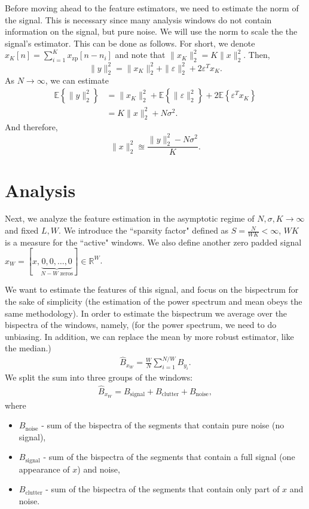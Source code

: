 \documentclass[12pt,a4paper]{article}
\numberwithin{equation}{section}
\numberwithin{figure}{section}
\theoremstyle{plain}
\theoremstyle{definition}
\theoremstyle{remark}
\theoremstyle{plain}
\theoremstyle{remark}
\theoremstyle{plain}
\theoremstyle{plain}
\newcommand{\E}[1]{\mathbb{E}\left\{{#1} \right\}}
\newcommand{\xz}{x_{\textrm{zp}}}
\begin{document}
Before moving ahead to the feature estimators, we need to estimate the norm of the signal. This is necessary since many analysis windows do not contain information on the signal, but pure noise. We will use the norm to scale the the signal's estimator.
This can be done as follows. For short, we denote $x_K[n]=\sum_{i=1}^K \xz[n-n_i]$ and note that $\|x_K\|_2^2 = K\|x\|_2^2$. 
Then,
\begin{equation}
\| y\|_2^2 =  \| x_K\|_2^2 + \|\varepsilon\|_2^2 + 2\varepsilon^Tx_K. 
\end{equation}  
As $N\to\infty$, we can estimate 
\begin{equation}
\begin{split}
\E{\| y\|_2^2} &=  \| x_K\|_2^2 + \E{\|\varepsilon\|_2^2} + 2\E{\varepsilon^Tx_K} \\ 
&= K\|x\|_2^2 + N\sigma^2. 
\end{split}	 
\end{equation}   
And therefore, 
\begin{equation}
\|x\|_2^2 \approxeq \frac{\| y\|_2^2 - N\sigma^2}{K}. 
\end{equation}


\section{Analysis} \label{sec:analysis}


Next, we analyze the feature estimation in the asymptotic regime of $N,\sigma,K\to\infty$ and fixed $L,W$. We introduce the ``sparsity factor" defined as $S = \frac{N}{WK}<\infty$, $WK$ is a measure for the ``active" windows. We also define  another zero padded signal $x_W  = [x, \underbrace{0,0,\ldots,0}_{N-W \text{ zeros}}]\in\mathbb{R}^W$.

We want to estimate the features of this signal, and focus on the bispectrum for the sake of simplicity (the estimation of the power spectrum and mean obeys the same methodology). 
In order to estimate the bispectrum we average over the bispectra of the windows, namely, (for the power spectrum, we need to do unbiasing. In addition, we can replace the mean by more robust estimator, like the median.)
\begin{eqnarray}
\hat{B}_{x_W} = \frac{W}{N}\sum_{i=1}^{N/W}B_{y_i}.
\end{eqnarray}
We split the sum into three groups of the windows:
\begin{eqnarray}
\hat{B}_{x_W} = B_\textrm{signal} + B_\textrm{clutter} + B_\textrm{noise}, 
\end{eqnarray}
where
\begin{itemize}
	\item $B_\textrm{noise}$ - sum of the bispectra of the segments that contain pure noise (no signal),
	\item $B_\textrm{signal}$ - sum of the bispectra of the segments that contain a full signal (one appearance of $x$) and noise,
	\item $B_\textrm{clutter}$ - sum of the bispectra of the segments that contain only part of $x$ and noise.
\end{itemize}
\end{document}
